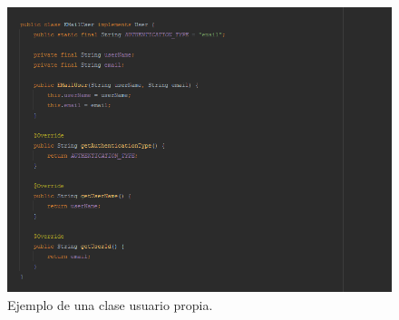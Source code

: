 \begin{figure}[H]
  \centering
    \includegraphics[scale=0.6]{50-anexos/B-uso/identificacion_user_propio.png} 
    \caption{Ejemplo de una clase usuario propia.}
\end{figure}	

